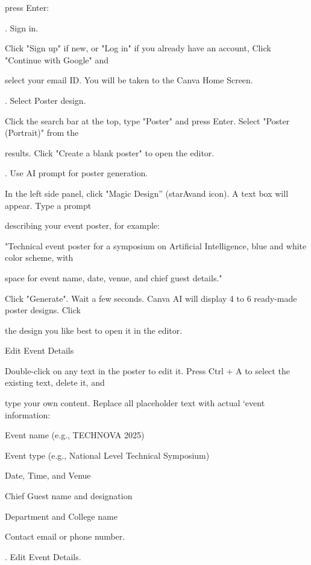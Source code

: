 \documentclass[10pt,a4paper]{article}
\begin{document}
\noindent press Enter:\par
{}. Sign in.\par
\noindent Click "Sign up" if new, or "Log in" if you already have an account, Click "Continue with Google" and\par
\noindent select your email ID. You will be taken to the Canva Home Screen.\par
{}. Select Poster design.\par
\noindent Click the search bar at the top, type "Poster" and press Enter. Select "Poster (Portrait)" from the\par
\noindent results. Click "Create a blank poster" to open the editor.\par
{}. Use AI prompt for poster generation.\par
\clearpage
\noindent In the left side panel, click "Magic Design” (starAvand icon). A text box will appear. Type a prompt\par
\noindent describing your event poster, for example:\par
\noindent "Technical event poster for a symposium on Artificial Intelligence, blue and white color scheme, with\par
\noindent space for event name, date, venue, and chief guest details."\par
\noindent Click "Generate". Wait a few seconds. Canva AI will display 4 to 6 ready-made poster designs. Click\par
\noindent the design you like best to open it in the editor.\par
\noindent Edit Event Details\par
\noindent Double-click on any text in the poster to edit it. Press Ctrl + A to select the existing text, delete it, and\par
\noindent type your own content. Replace all placeholder text with actual ‘event information:\par
\noindent Event name (e.g., TECHNOVA 2025)\par
\noindent Event type (e.g., National Level Technical Symposium)\par
\noindent Date, Time, and Venue\par
\noindent Chief Guest name and designation\par
\noindent Department and College name\par
\noindent Contact email or phone number.\par
{}. Edit Event Details.\par
\end{document}

